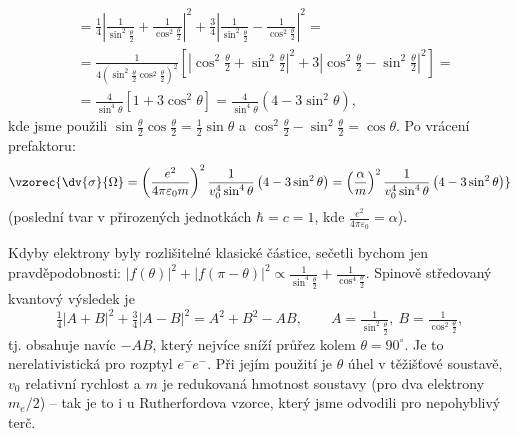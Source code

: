 \begin{align}
  &= \frac14\left|\frac{1}{\sin^2\frac\theta2} + \frac{1}{\cos^2\frac\theta2}\right|^2 + \frac34\left|\frac{1}{\sin^2\frac\theta2} - \frac{1}{\cos^2\frac\theta2}\right|^2 = \\
  &= \frac{1}{4\left(\sin^2\frac\theta2\cos^2\frac\theta2\right)^2}\left[\left|\cos^2\frac\theta2+\sin^2\frac\theta2\right|^2 + 3\left|\cos^2\frac\theta2-\sin^2\frac\theta2\right|^2\right] = \\
  &= \frac{4}{\sin^4\theta}\left[1+3\cos^2\theta\right] = \frac{4}{\sin^4\theta}\left(4-3\sin^2\theta\right),
\end{align}
kde jsme použili $\sin\frac\theta2\cos\frac\theta2 = \frac12\sin\theta$ a $\cos^2\frac\theta2-\sin^2\frac\theta2 = \cos\theta$. Po vrácení prefaktoru:
\begin{equation}
  \vzorec{\dv{\sigma}{\Omega} = \left(\frac{e^2}{4\pi\varepsilon_0 m}\right)^2\frac{1}{v_0^4\sin^4\theta}\left(4-3\sin^2\theta\right) = \left(\frac{\alpha}{m}\right)^2\frac{1}{v_0^4\sin^4\theta}\left(4-3\sin^2\theta\right)}
\end{equation}
(poslední tvar v přirozených jednotkách $\hbar=c=1$, kde $\frac{e^2}{4\pi\varepsilon_0}=\alpha$).

\begin{vysvetleni}
Kdyby elektrony byly rozlišitelné klasické částice, sečetli bychom jen pravděpodobnosti: $|f(\theta)|^2+|f(\pi-\theta)|^2 \propto \frac{1}{\sin^4\frac\theta2}+\frac{1}{\cos^4\frac\theta2}$. Spinově středovaný kvantový výsledek je
\[
  \tfrac14|A+B|^2+\tfrac34|A-B|^2 = A^2+B^2 - AB,\qquad A = \tfrac{1}{\sin^2\frac\theta2},\ B=\tfrac{1}{\cos^2\frac\theta2},
\]
tj. obsahuje navíc  $-AB$, který nejvíce sníží průřez kolem $\theta=90^\circ$. Je to nerelativistická  pro rozptyl $e^-e^-$. Při jejím použití je $\theta$ úhel v těžišťové soustavě, $v_0$ relativní rychlost a $m$ je redukovaná hmotnost soustavy (pro dva elektrony $m_e/2$) -- tak je to i u Rutherfordova vzorce, který jsme odvodili pro nepohyblivý terč.
\end{vysvetleni}

\begin{center}
\end{center}

